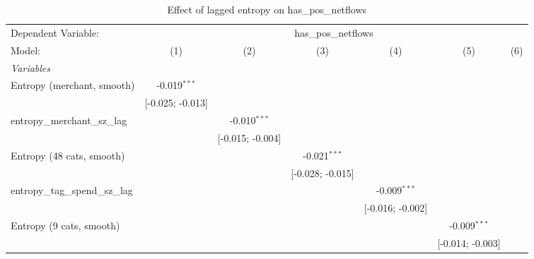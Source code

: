 
\begin{table}[htbp]
   \centering
   \tiny
   \begin{threeparttable}[b]
      \caption{\label{tab:reg_has_pos_netflows_lagged_sz} Effect of lagged entropy on has\_pos\_netflows}
      \begin{tabular}{lcccccc}
         \tabularnewline \midrule \midrule
         Dependent Variable: & \multicolumn{6}{c}{has\_pos\_netflows}\\
         Model:                           & (1)              & (2)              & (3)              & (4)              & (5)              & (6)\\  
         \midrule
         \emph{Variables}\\
         Entropy (merchant, smooth)       & -0.019$^{***}$   &                  &                  &                  &                  &   \\   
                                          & [-0.025; -0.013] &                  &                  &                  &                  &   \\   
         entropy\_merchant\_sz\_lag       &                  & -0.010$^{***}$   &                  &                  &                  &   \\   
                                          &                  & [-0.015; -0.004] &                  &                  &                  &   \\   
         Entropy (48 cats, smooth)        &                  &                  & -0.021$^{***}$   &                  &                  &   \\   
                                          &                  &                  & [-0.028; -0.015] &                  &                  &   \\   
         entropy\_tag\_spend\_sz\_lag     &                  &                  &                  & -0.009$^{***}$   &                  &   \\   
                                          &                  &                  &                  & [-0.016; -0.002] &                  &   \\   
         Entropy (9 cats, smooth)         &                  &                  &                  &                  & -0.009$^{***}$   &   \\   
                                          &                  &                  &                  &                  & [-0.014; -0.003] &   \\   

\end{tabular}
\end{threeparttable}
\end{table}
